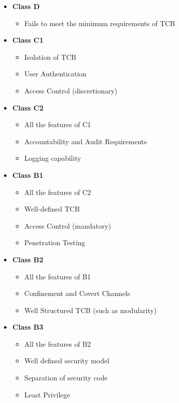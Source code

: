     \begin{itemize}
      \item \textbf{Class D}
      \begin{itemize}
        \item Fails to meet the minimum requirements of TCB
      \end{itemize}
      \item \textbf{Class C1}
      \begin{itemize}
        \item Isolation of TCB
        \item User Authentication
        \item Access Control (discretionary)
      \end{itemize}
      \item \textbf{Class C2}
      \begin{itemize}
        \item All the features of C1
        \item Accountability and Audit Requirements
        \item Logging capability
      \end{itemize}
      \item \textbf{Class B1}
      \begin{itemize}
        \item All the features of C2
        \item Well-defined TCB
        \item Access Control (mandatory)
        \item Penetration Testing
      \end{itemize}
      \item \textbf{Class B2}
      \begin{itemize}
        \item All the features of B1
        \item Confinement and Covert Channels
        \item Well Structured TCB (such as modularity)
      \end{itemize}
      \item \textbf{Class B3}
      \begin{itemize}
        \item All the features of B2
        \item Well defined security model
        \item Separation of security code
        \item Least Privilege
      \end{itemize}

\end{itemize}
